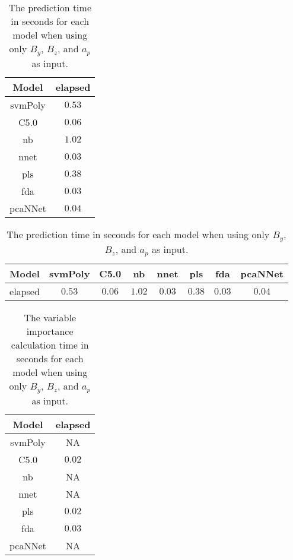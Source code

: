 \begin{table}[!ht]
	\centering
	\begin{tabular}{|c|c|}
		\hline
		Model & elapsed \\ \hline
		svmPoly & $0.53$ \\ \hline
		C5.0 & $0.06$ \\ \hline
		nb & $1.02$ \\ \hline
		nnet & $0.03$ \\ \hline
		pls & $0.38$ \\ \hline
		fda & $0.03$ \\ \hline
		pcaNNet & $0.04$ \\ \hline
	\end{tabular}
	\caption{The prediction time in seconds for each model when using only $B_{y}$, $B_{z}$, and $a_{p}$ as input.}
	\label{tab:time:yzap:predict}
\end{table}

\begin{table}[!ht]
	\centering
	\begin{tabular}{|c|c|c|c|c|c|c|c|}
		\hline
		Model & svmPoly & C5.0 & nb & nnet & pls & fda & pcaNNet \\ \hline
		elapsed & $0.53$ & $0.06$ & $1.02$ & $0.03$ & $0.38$ & $0.03$ & $0.04$ \\ \hline
	\end{tabular}
	\caption{The prediction time in seconds for each model when using only $B_{y}$, $B_{z}$, and $a_{p}$ as input.}
	\label{tab:time:reverse:yzap:predict}
\end{table}

\begin{table}[!ht]
	\centering
	\begin{tabular}{|c|c|}
		\hline
		Model & elapsed \\ \hline
		svmPoly & NA \\ \hline
		C5.0 & $0.02$ \\ \hline
		nb & NA \\ \hline
		nnet & NA \\ \hline
		pls & $0.02$ \\ \hline
		fda & $0.03$ \\ \hline
		pcaNNet & NA \\ \hline
	\end{tabular}
	\caption{The variable importance calculation time in seconds for each model when using only $B_{y}$, $B_{z}$, and $a_{p}$ as input.}
	\label{tab:time:yzap:importance}
\end{table}

